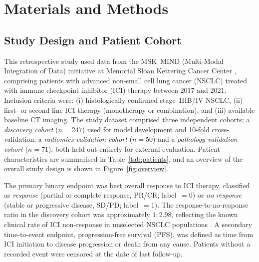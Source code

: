 \section{Materials and Methods}
\label{sec:methods}


\subsection{Study Design and Patient Cohort}
\label{sec:cohort}

This retrospective study used data from the MSK~MIND (Multi-Modal Integration of Data)
initiative at Memorial Sloan Kettering Cancer Center \cite{Vanguri2022},
comprising patients with advanced non-small cell lung cancer (NSCLC) treated with
immune checkpoint inhibitor (ICI) therapy between 2017 and 2021.
Inclusion criteria were: (i) histologically confirmed stage~IIIB/IV NSCLC,
(ii) first- or second-line ICI therapy (monotherapy or combination),
and (iii) available baseline CT imaging.
The study dataset comprised three independent cohorts:
a \emph{discovery cohort} ($n = 247$) used for model development and
10-fold cross-validation; a \emph{radiomics validation cohort}
($n = 50$) and a \emph{pathology validation cohort} ($n = 71$),
both held out entirely for external evaluation.
Patient characteristics are summarised in Table~\ref{tab:patients}, and an
overview of the overall study design is shown in Figure~\ref{fig:overview}.



The primary binary endpoint was best overall response to ICI therapy,
classified as \emph{response} (partial or complete response, PR/CR; label~$= 0$)
or \emph{no response} (stable or progressive disease, SD/PD; label~$= 1$).
The response-to-no-response ratio in the discovery cohort was approximately
$1 : 2.98$, reflecting the known clinical rate of ICI non-response in unselected
NSCLC populations \cite{Borghaei2015}.
A secondary time-to-event endpoint, progression-free survival (PFS), was defined
as time from ICI initiation to disease progression or death from any cause.
Patients without a recorded event were censored at the date of last follow-up.

